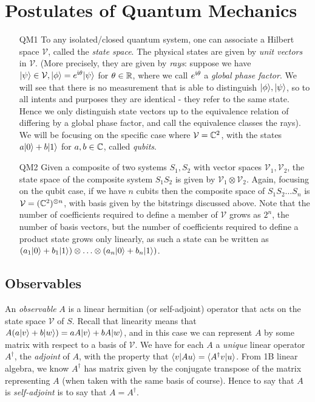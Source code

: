 \documentclass[10pt,a4paper]{article}
\begin{document}
\section{Postulates of Quantum Mechanics}
\begin{enumerate}
\item[QM1] To any isolated/closed quantum system, one can associate a Hilbert space $\mathcal{V}$, called the \emph{state space}. The physical states are given by \emph{unit vectors} in $\mathcal{V}$. (More precisely, they are given by \emph{rays}: suppose we have $|\psi\rangle\in \mathcal{V}, |\phi\rangle = e^{\mathfrak{i}\theta}|\psi\rangle$ for $\theta \in \mathbb{R}$, where we call $e^{\mathfrak{i}\theta}$ a \emph{global phase factor}. We will see that there is no measurement that is able to distinguish $|\phi\rangle, |\psi\rangle$, so to all intents and purposes they are identical - they refer to the same state. Hence we only distinguish state vectors up to the equivalence relation of differing by a global phase factor, and call the equivalence classes the rays). We will be focusing on the specific case where $\mathcal{V} = \mathbb{C}^2$, with the states $a|0\rangle + b|1\rangle$ for $a,b \in \mathbb{C}$, called \emph{qubits}.

\item[QM2] Given a composite of two systems $S_1, S_2$ with vector spaces $\mathcal{V}_1, \mathcal{V}_2$, the state space of the composite system $S_1S_2$ is given by $\mathcal{V}_1\otimes \mathcal{V}_2$. Again, focusing on the qubit case, if we have $n$ cubits then the composite space of $S_1S_2\ldots S_n$ is $\mathcal{V} = (\mathbb{C}^2)^{\otimes n}$, with basis given by the bitstrings discussed above. Note that the number of coefficients required to define a member of $\mathcal{V}$ grows as $2^n$, the number of basis vectors, but the number of coefficients required to define a product state grows only linearly, as such a state can be written as $(a_1|0\rangle+b_1|1\rangle)\otimes\ldots\otimes(a_n|0\rangle+b_n|1\rangle)$.
\end{enumerate}

\subsection{Observables}
An \emph{observable} $A$ is a linear hermitian (or self-adjoint) operator that acts on the state space $\mathcal{V}$ of $S$. Recall that linearity means that $A(a|v\rangle + b|w\rangle) = aA|v\rangle + bA|w\rangle$, and in this case we can represent $A$ by some matrix with respect to a basis of $\mathcal{V}$. We have for each $A$ a \textit{unique} linear operator $A^{\dag}$, the \emph{adjoint} of $A$, with the property that $\langle v | Au \rangle = \langle A^{\dag}v | u \rangle$. From 1B linear algebra, we know $A^{\dag}$ has matrix given by the conjugate transpose of the matrix representing $A$ (when taken with the same basis of course). Hence to say that $A$ is \emph{self-adjoint} is to say that $A = A^{\dag}$.
\end{document}
